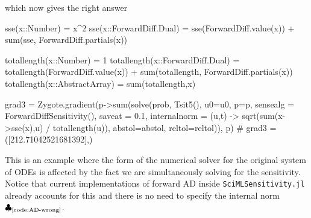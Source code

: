 which now gives the right answer
\begin{jllisting}
sse(x::Number) = x^2
sse(x::ForwardDiff.Dual) = sse(ForwardDiff.value(x)) + sum(sse, ForwardDiff.partials(x))

totallength(x::Number) = 1
totallength(x::ForwardDiff.Dual) = totallength(ForwardDiff.value(x)) + sum(totallength, ForwardDiff.partials(x))
totallength(x::AbstractArray) = sum(totallength,x)

grad3 = Zygote.gradient(p->sum(solve(prob, Tsit5(), u0=u0, p=p, sensealg = ForwardDiffSensitivity(), saveat = 0.1, internalnorm = (u,t) -> sqrt(sum(x->sse(x),u) / totallength(u)), abstol=abstol, reltol=reltol)), p)
# grad3 = ([212.71042521681392],)
\end{jllisting}
This is an example where the form of the numerical solver for the original system of ODEs is affected by the fact we are simultaneously solving for the sensitivity. 
Notice that current implementations of forward AD inside \texttt{SciMLSensitivity.jl} already accounts for this and there is no need to specify the internal norm $\clubsuit_\text{\ref{code:AD-wrong}}$. 


